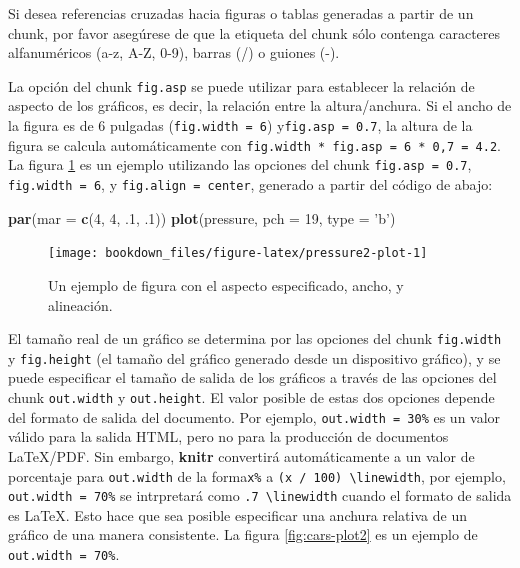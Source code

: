 \documentclass[12pt,]{krantz}
\makeatletter
\newenvironment{Shaded}{\begin{snugshade}}{\end{snugshade}}
\newcommand{\KeywordTok}[1]{\textcolor[rgb]{0.13,0.29,0.53}{\textbf{#1}}}
\newcommand{\DataTypeTok}[1]{\textcolor[rgb]{0.13,0.29,0.53}{#1}}
\newcommand{\DecValTok}[1]{\textcolor[rgb]{0.00,0.00,0.81}{#1}}
\newcommand{\StringTok}[1]{\textcolor[rgb]{0.31,0.60,0.02}{#1}}
\newcommand{\NormalTok}[1]{#1}
\newenvironment{kframe}{%
\medskip{}
\setlength{\fboxsep}{.8em}
 \def\at@end@of@kframe{}%
 \ifinner\ifhmode%
  \def\at@end@of@kframe{\end{minipage}}%
  \begin{minipage}{\columnwidth}%
 \fi\fi%
 \def\FrameCommand##1{\hskip\@totalleftmargin \hskip-\fboxsep
 \colorbox{shadecolor}{##1}\hskip-\fboxsep
     \hskip-\linewidth \hskip-\@totalleftmargin \hskip\columnwidth}%
 \MakeFramed {\advance\hsize-\width
   \@totalleftmargin\z@ \linewidth\hsize
   \@setminipage}}%
 {\par\unskip\endMakeFramed%
 \at@end@of@kframe}
\renewenvironment{Shaded}{\begin{kframe}}{\end{kframe}}
\theoremstyle{definition}
\theoremstyle{definition}
\theoremstyle{definition}
\theoremstyle{remark}
\let\BeginKnitrBlock\begin \let\EndKnitrBlock\end
\makeatother
\begin{document}
\BeginKnitrBlock{rmdimportant}
Si desea referencias cruzadas hacia figuras o tablas generadas a partir
de un chunk, por favor asegúrese de que la etiqueta del chunk sólo
contenga caracteres alfanuméricos (a-z, A-Z, 0-9), barras (/) o guiones
(-).
\EndKnitrBlock{rmdimportant}

La opción del chunk \texttt{fig.asp} se puede utilizar para establecer
la relación de aspecto de los gráficos, es decir, la relación entre la
altura/anchura. Si el ancho de la figura es de 6 pulgadas
(\texttt{fig.width\ =\ 6}) y\texttt{fig.asp\ =\ 0.7}, la altura de la
figura se calcula automáticamente con
\texttt{fig.width\ *\ fig.asp\ =\ 6\ *\ 0,7\ =\ 4.2}. La figura
\ref{fig:pressure2-plot} es un ejemplo utilizando las opciones del chunk
\texttt{fig.asp\ =\ 0.7}, \texttt{fig.width\ =\ 6}, y
\texttt{fig.align\ =\ \textquotesingle{}center\textquotesingle{}},
generado a partir del código de abajo:

\begin{Shaded}
\begin{Highlighting}[]
\KeywordTok{par}\NormalTok{(}\DataTypeTok{mar =} \KeywordTok{c}\NormalTok{(}\DecValTok{4}\NormalTok{, }\DecValTok{4}\NormalTok{, .}\DecValTok{1}\NormalTok{, .}\DecValTok{1}\NormalTok{))}
\KeywordTok{plot}\NormalTok{(pressure, }\DataTypeTok{pch =} \DecValTok{19}\NormalTok{, }\DataTypeTok{type =} \StringTok{'b'}\NormalTok{)}
\end{Highlighting}
\end{Shaded}

\begin{figure}

{\centering \texttt{[image: bookdown\_files/figure-latex/pressure2-plot-1]} 

}

\caption{Un ejemplo de figura con el aspecto especificado, ancho, y alineación.}\label{fig:pressure2-plot}
\end{figure}

El tamaño real de un gráfico se determina por las opciones del chunk
\texttt{fig.width} y \texttt{fig.height} (el tamaño del gráfico generado
desde un dispositivo gráfico), y se puede especificar el tamaño de
salida de los gráficos a través de las opciones del chunk
\texttt{out.width} y \texttt{out.height}. El valor posible de estas dos
opciones depende del formato de salida del documento. Por ejemplo,
\texttt{out.width\ =\ \textquotesingle{}30\%\textquotesingle{}} es un
valor válido para la salida HTML, pero no para la producción de
documentos LaTeX/PDF. Sin embargo, \textbf{knitr} convertirá
automáticamente a un valor de porcentaje para \texttt{out.width} de la
forma\texttt{\textasciigrave{}x\%} a
\texttt{(x\ /\ 100)\ \textbackslash{}linewidth}, por ejemplo,
\texttt{out.width\ =\ \textquotesingle{}70\%\textquotesingle{}} se
intrpretará como \texttt{.7\ \textbackslash{}linewidth} cuando el
formato de salida es LaTeX. Esto hace que sea posible especificar una
anchura relativa de un gráfico de una manera consistente. La figura
\ref{fig:cars-plot2} es un ejemplo de \texttt{out.width\ =\ 70\%}.
\end{document}
